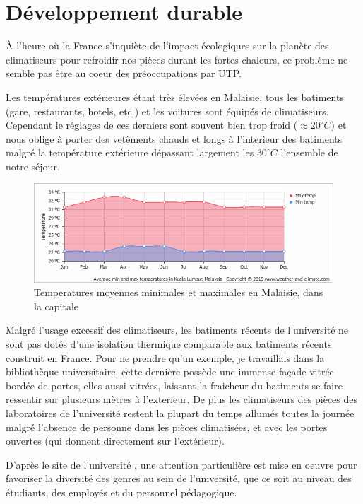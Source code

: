 \chapter{Développement durable}

À l'heure où la France s'inquiète de l'impact écologiques sur la planète des climatiseurs pour refroidir nos pièces durant les fortes chaleurs, ce problème ne semble pas être au coeur des préoccupations par UTP.

Les températures extérieures étant très élevées en Malaisie, tous les batiments (gare, restaurants, hotels, etc.) et les voitures sont équipés de climatiseurs. Cependant le réglages de ces derniers sont souvent bien trop froid ($\approx 20^{\circ}C$) et nous oblige à porter des vetêments chauds et longs à l'interieur des batiments malgré la température extérieure dépassant largement les $30^{\circ}C$ l'ensemble de  notre séjour.

\begin{figure}[h]
  \includegraphics[width=1\linewidth]{content/imgs/temp.png}
  \caption{Temperatures moyennes minimales et maximales en Malaisie, dans la capitale}
  \label{fig:climate}
\end{figure}

Malgré l'usage excessif des climatiseurs, les batiments récents de l'université ne sont pas dotés d'une isolation thermique comparable aux batiments récents construit en France. Pour ne prendre qu'un exemple, je travaillais dans la bibliothèque universitaire, cette dernière possède une immense façade vitrée bordée de portes, elles aussi vitrées, laissant la fraicheur du batiments se faire ressentir sur plusieurs mètres à l'exterieur. De plus les climatiseurs des pièces des laboratoires de l'université restent la plupart du temps allumés toutes la journée malgré l'absence de personne dans les pièces climatisées, et avec les portes ouvertes (qui donnent directement sur l'extérieur).

D'après le site de l'université \cite{utp_gender}, une attention particulière est mise en oeuvre pour favoriser la diversité des genres au sein de l'université, que ce soit au niveau des étudiants, des employés et du personnel pédagogique.

